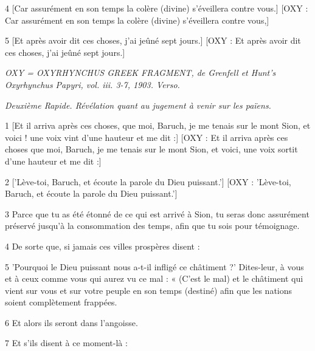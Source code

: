 \par 4 [Car assurément en son temps la colère (divine) s'éveillera contre vous.] [OXY : Car assurément en son temps la colère (divine) s'éveillera contre vous,]

\par [Qui est maintenant retenu par la patience comme par des rênes.] [OXY : Qui est maintenant retenu par la patience comme par une rêne.]

\par 5 [Et après avoir dit ces choses, j'ai jeûné sept jours.] [OXY : Et après avoir dit ces choses, j'ai jeûné sept jours.]



\par \textit{OXY = OXYRHYNCHUS GREEK FRAGMENT, de Grenfell et Hunt's Oxyrhynchus Papyri, vol. iii. 3-7, 1903. Verso.}

\par \textit{Deuxième Rapide. Révélation quant au jugement à venir sur les païens.}

\par 1 [Et il arriva après ces choses, que moi, Baruch, je me tenais sur le mont Sion, et voici ! une voix vint d'une hauteur et me dit :] [OXY : Et il arriva après ces choses que moi, Baruch, je me tenais sur le mont Sion, et voici, une voix sortit d'une hauteur et me dit :]

\par 2 ['Lève-toi, Baruch, et écoute la parole du Dieu puissant.'] [OXY : 'Lève-toi, Baruch, et écoute la parole du Dieu puissant.']

\par 3 Parce que tu as été étonné de ce qui est arrivé à Sion, tu seras donc assurément préservé jusqu'à la consommation des temps, afin que tu sois pour témoignage.

\par 4 De sorte que, si jamais ces villes prospères disent :

\par 5 'Pourquoi le Dieu puissant nous a-t-il infligé ce châtiment ?' Dites-leur, à vous et à ceux comme vous qui aurez vu ce mal : « (C'est le mal) et le châtiment qui vient sur vous et sur votre peuple en son temps (destiné) afin que les nations soient complètement frappées.

\par 6 Et alors ils seront dans l'angoisse.

\par 7 Et s'ils disent à ce moment-là :

